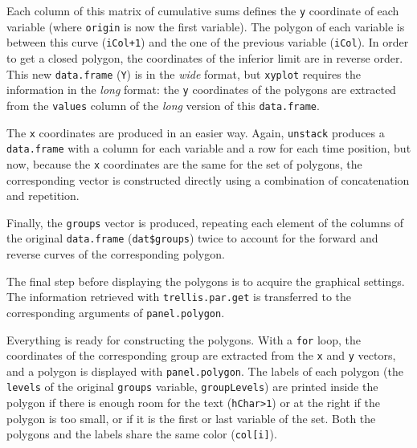 Each column of this matrix of cumulative sums defines the \texttt{y}
coordinate of each variable (where \texttt{origin} is now the first
variable). The polygon of each variable is between this curve
(\texttt{iCol+1}) and the one of the previous variable (\texttt{iCol}). In order to
get a closed polygon, the coordinates of the inferior limit are in
reverse order. This new \texttt{data.frame} (\texttt{Y}) is in the \emph{wide} format,
but \texttt{xyplot} requires the information in the \emph{long} format: the \texttt{y}
coordinates of the polygons are extracted from the \texttt{values} column of
the \emph{long} version of this \texttt{data.frame}.

The \texttt{x} coordinates are produced in an easier way. Again, \texttt{unstack}
produces a \texttt{data.frame} with a column for each variable and a row
for each time position, but now, because the \texttt{x} coordinates are the same
for the set of polygons, the corresponding vector is constructed
directly using a combination of concatenation and repetition.

Finally, the \texttt{groups} vector is produced, repeating each element of
the columns of the original \texttt{data.frame} (\texttt{dat\$groups}) twice to
account for the forward and reverse curves of the corresponding
polygon.

The final step before displaying the polygons is to acquire the
graphical settings. The information retrieved with
\texttt{trellis.par.get} is transferred to the corresponding arguments of
\texttt{panel.polygon}.

Everything is ready for constructing the polygons. With a \texttt{for} loop,
the coordinates of the corresponding group are extracted from the \texttt{x}
and \texttt{y} vectors, and a polygon is displayed with \texttt{panel.polygon}. The
labels of each polygon (the \texttt{levels} of the original \texttt{groups}
variable, \texttt{groupLevels}) are printed inside the polygon if there is
enough room for the text (\texttt{hChar>1}) or at the right if the polygon is
too small, or if it is the first or last variable of the set. Both the
polygons and the labels share the same color (\texttt{col[i]}).


